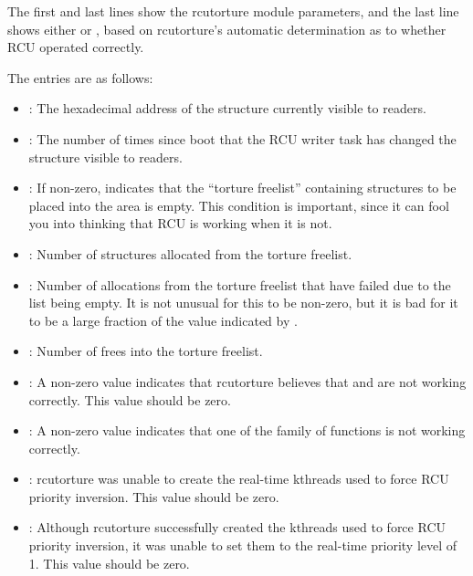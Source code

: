 The first and last lines show the rcutorture module parameters, and the
last line shows either  or , based on rcutorture's
automatic determination as to whether RCU operated correctly.

The entries are as follows:

\begin{itemize}
\item	{}: The hexadecimal address of the structure currently visible
	to readers.

\item	{}: The number of times since boot that the RCU writer task
	has changed the structure visible to readers.

\item	{}: If non-zero, indicates that the ``torture freelist''
	containing structures to be placed into the  area is empty.
	This condition is important, since it can fool you into thinking
	that RCU is working when it is not.
	\Sey %

\item	{}: Number of structures allocated from the torture freelist.

\item	{}: Number of allocations from the torture freelist that have
	failed due to the list being empty.
	It is not unusual for this
	to be non-zero, but it is bad for it to be a large fraction of
	the value indicated by .

\item	{}: Number of frees into the torture freelist.

\item	{}: A non-zero value indicates that rcutorture believes that
	 and  are not working
	correctly.
	This value should be zero.

\item	{}: A non-zero value indicates that one of the 
	family of functions is not working correctly.

\item	{}: rcutorture was unable to create the real-time kthreads
	used to force RCU priority inversion.
	This value should be zero.

\item	{}: Although rcutorture successfully created the kthreads
	used to force RCU priority inversion, it was unable to set them
	to the real-time priority level of 1.
	This value should be zero.


\end{itemize}
